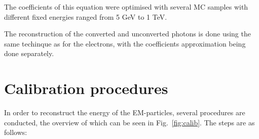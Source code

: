 The coefficients of this equation were optimised with several MC samples with different fixed energies ranged from 5 GeV to 1 TeV.

The reconstruction of the converted and unconverted photons is done using the same techinque as for the electrons, with the coefficients approximation being done separately.

\section{Calibration procedures}

\begin{figure}
\end{figure}

In order to reconstruct the energy of the EM-particles, several procedures are conducted, the overview of which can be seen in Fig.~\ref{fig:calib}. The steps are as follows:


